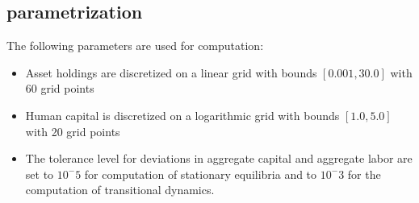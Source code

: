 \subsection{parametrization}

The following parameters are used for computation:
\begin{itemize}
    \item Asset holdings are discretized on a linear grid with bounds $[0.001, 30.0]$ with 60 grid points
    \item Human capital is discretized on a logarithmic grid with bounds $[1.0, 5.0]$ with 20 grid points
    \item The tolerance level for deviations in aggregate capital and aggregate labor are set to $10^-5$ for computation of stationary equilibria and to $10^-3$ for the computation of transitional dynamics.
\end{itemize}